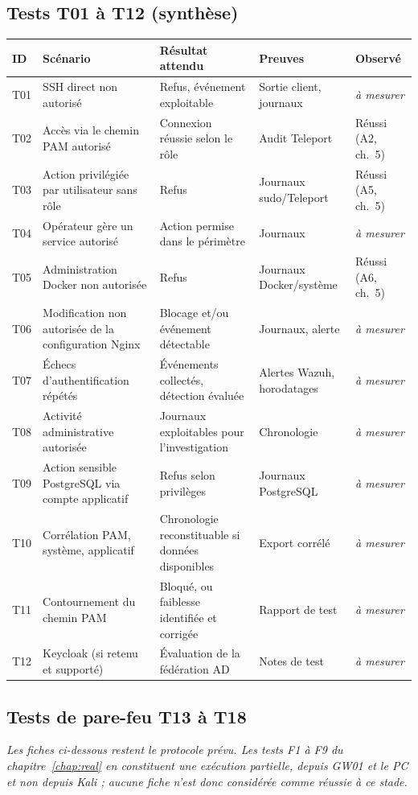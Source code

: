 \documentclass[11pt,a4paper]{report}
\newcommand{\amesurer}{\emph{à mesurer}}
\begin{document}
\subsection{Tests T01 à T12 (synthèse)}
\footnotesize
\begin{longtable}{@{}p{0.9cm}p{4.2cm}p{4.2cm}p{3.2cm}p{1.6cm}@{}}
\toprule\textbf{ID} & \textbf{Scénario} & \textbf{Résultat attendu} & \textbf{Preuves} & \textbf{Observé}\\ \midrule\endhead
T01 & SSH direct non autorisé & Refus, événement exploitable & Sortie client, journaux & \amesurer\\
T02 & Accès via le chemin PAM autorisé & Connexion réussie selon le rôle & Audit Teleport & Réussi (A2, ch.~5)\\
T03 & Action privilégiée par utilisateur sans rôle & Refus & Journaux sudo/Teleport & Réussi (A5, ch.~5)\\
T04 & Opérateur gère un service autorisé & Action permise dans le périmètre & Journaux & \amesurer\\
T05 & Administration Docker non autorisée & Refus & Journaux Docker/système & Réussi (A6, ch.~5)\\
T06 & Modification non autorisée de la configuration Nginx & Blocage et/ou événement détectable & Journaux, alerte & \amesurer\\
T07 & Échecs d'authentification répétés & Événements collectés, détection évaluée & Alertes Wazuh, horodatages & \amesurer\\
T08 & Activité administrative autorisée & Journaux exploitables pour l'investigation & Chronologie & \amesurer\\
T09 & Action sensible PostgreSQL via compte applicatif & Refus selon privilèges & Journaux PostgreSQL & \amesurer\\
T10 & Corrélation PAM, système, applicatif & Chronologie reconstituable si données disponibles & Export corrélé & \amesurer\\
T11 & Contournement du chemin PAM & Bloqué, ou faiblesse identifiée et corrigée & Rapport de test & \amesurer\\
T12 & Keycloak (si retenu et supporté) & Évaluation de la fédération AD & Notes de test & \amesurer\\
\bottomrule
\end{longtable}
\normalsize

\subsection{Tests de pare-feu T13 à T18}
\textit{Les fiches ci-dessous restent le protocole prévu. Les tests F1 à F9 du chapitre~\ref{chap:real} en constituent une exécution partielle, depuis GW01 et le PC et non depuis Kali ; aucune fiche n'est donc considérée comme réussie à ce stade.}
\end{document}
